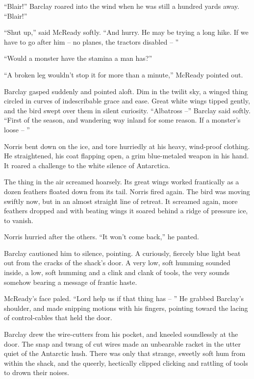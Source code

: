 \documentclass[letterpaper,openany,12pt]{memoir}		%
\begin{document}
``Blair!'' Barclay roared into the wind when he was still a hundred yards away.
``Blair!''

``Shut up,'' said McReady softly. ``And hurry. He may be trying a long hike. If
we have to go after him -- no planes, the tractors disabled -- ''

``Would a monster have the stamina a man has?''

``A broken leg wouldn't stop it for more than a minute,'' McReady pointed out.

Barclay gasped suddenly and pointed aloft. Dim in the twilit sky, a winged thing
circled in curves of indescribable grace and ease. Great white wings tipped
gently, and the bird swept over them in silent curiosity. ``Albatross --''
Barclay said softly. ``First of the season, and wandering way inland for some
reason. If a monster's loose -- ''

Norris bent down on the ice, and tore hurriedly at his heavy, wind-proof
clothing. He straightened, his coat flapping open, a grim blue-metaled weapon in
his hand. It roared a challenge to the white silence of Antarctica.

The thing in the air screamed hoarsely. Its great wings worked frantically as a
dozen feathers floated down from its tail. Norris fired again. The bird was
moving swiftly now, but in an almost straight line of retreat. It screamed
again, more feathers dropped and with beating wings it soared behind a ridge of
pressure ice, to vanish.

Norris hurried after the others. ``It won't come back,'' he panted.

Barclay cautioned him to silence, pointing. A curiously, fiercely blue light
beat out from the cracks of the shack's door. A very low, soft humming sounded
inside, a low, soft humming and a clink and clank of tools, the very sounds
somehow bearing a message of frantic haste.

McReady's face paled. ``Lord help us if that thing has -- '' He grabbed
Barclay's shoulder, and made snipping motions with his fingers, pointing toward
the lacing of control-cables that held the door.

Barclay drew the wire-cutters from his pocket, and kneeled soundlessly at the
door. The snap and twang of cut wires made an unbearable racket in the utter
quiet of the Antarctic hush. There was only that strange, sweetly soft hum from
within the shack, and the queerly, hectically clipped clicking and rattling of
tools to drown their noises.
\end{document}
